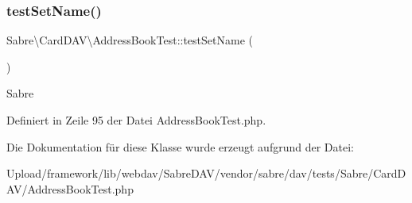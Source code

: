 \subsubsection{\texorpdfstring{test\+Set\+Name()}{testSetName()}}
{\footnotesize\ttfamily Sabre\textbackslash{}\+Card\+D\+A\+V\textbackslash{}\+Address\+Book\+Test\+::test\+Set\+Name (\begin{DoxyParamCaption}{ }\end{DoxyParamCaption})}

Sabre 

Definiert in Zeile 95 der Datei Address\+Book\+Test.\+php.



Die Dokumentation für diese Klasse wurde erzeugt aufgrund der Datei\+:\begin{DoxyCompactItemize}
\item 
Upload/framework/lib/webdav/\+Sabre\+D\+A\+V/vendor/sabre/dav/tests/\+Sabre/\+Card\+D\+A\+V/Address\+Book\+Test.\+php\end{DoxyCompactItemize}
